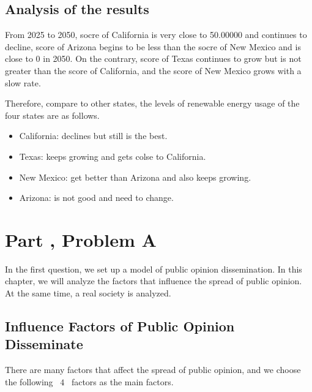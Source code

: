 \documentclass[a4paper,11pt]{article}
\begin{document}
\subsection{Analysis of the results}
\par From 2025 to 2050, socre of California is very close to 50.00000 and continues to decline, score of Arizona begins to be less than the socre of New Mexico and is close to 0 in 2050. On the contrary, score of Texas continues to grow but is not greater than the score of California, and the score of New Mexico grows with a slow rate.
\par Therefore, compare to other states, the levels of renewable energy usage of the four states are as follows.
\begin{itemize}
    \item California: declines but still is the best.
    \item Texas: keeps growing and gets colse to California.
    \item New Mexico: get better than Arizona and also keeps growing.
    \item Arizona: is not good and need to change.
\end{itemize}













\section{Part \uppercase\expandafter{}, Problem A}
\par In the first question, we set up a model of public opinion dissemination. In this chapter, we will analyze the factors that influence the spread of public opinion. At the same time, a real society is analyzed.
\subsection{Influence Factors of Public Opinion Disseminate}
\par There are many factors that affect the spread of public opinion, and we choose the following ~$4$~ factors as the main factors.
\end{document}
